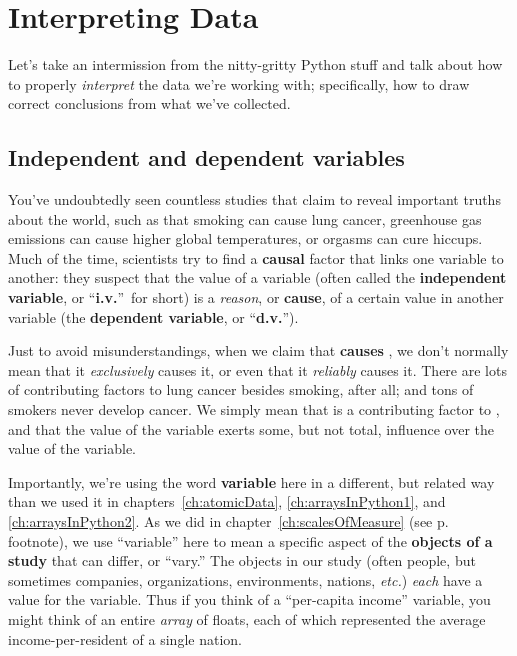 
\chapter{Interpreting Data}

Let's take an intermission from the nitty-gritty Python stuff and talk about
how to properly \textit{interpret} the data we're working with; specifically,
how to draw correct conclusions from what we've collected.

\section{Independent and dependent variables}


You've undoubtedly seen countless studies that claim to reveal important truths
about the world, such as that smoking can cause lung cancer, greenhouse gas
emissions can cause higher global temperatures, or orgasms can cure hiccups.
Much of the time, scientists try to find a \textbf{causal} factor that links
one variable to another: they suspect that the value of a variable  (often
called the \textbf{independent variable}, or ``\textbf{i.v.}''~for short) is a
\textit{reason}, or \textbf{cause}, of a certain value in another variable 
(the \textbf{dependent variable}, or ``\textbf{d.v.}'').

Just to avoid misunderstandings, when we claim that  \textbf{causes} , we
don't normally mean that it \textit{exclusively} causes it, or even that it
\textit{reliably} causes it. There are lots of contributing factors to lung
cancer besides smoking, after all; and tons of smokers never develop cancer. We
simply mean that  is a contributing factor to , and that the value of the
 variable exerts some, but not total, influence over the value of the 
variable.


Importantly, we're using the word \textbf{variable} here in a different, but
related way than we used it in chapters~\ref{ch:atomicData},
\ref{ch:arraysInPython1}, and \ref{ch:arraysInPython2}. As we did in
chapter~\ref{ch:scalesOfMeasure} (see p.~\pageref{variableDifferent} footnote),
we use ``variable'' here to mean a specific aspect of the \textbf{objects of a
study} that can differ, or ``vary.'' The objects in our study (often people,
but sometimes companies, organizations, environments, nations, \textit{etc.})
\textit{each} have a value for the variable. Thus if you think of a
``per-capita income'' variable, you might think of an entire \textit{array} of
floats, each of which represented the average income-per-resident of a single
nation.

